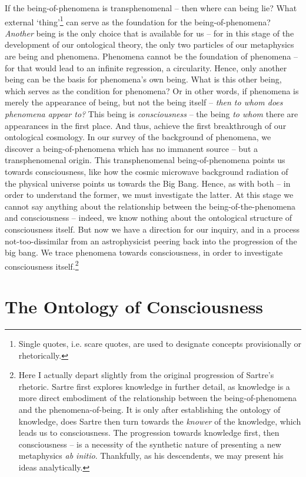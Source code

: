 If the being-of-phenomena is transphenomenal -- then where can being lie? What external \enquote*{thing}\footnote{Single quotes, i.e. scare quotes, are used to designate concepts provisionally or rhetorically.} can serve as the foundation for the being-of-phenomena? \emph{Another} being is the only choice that is available for us -- for in this stage of the development of our ontological theory, the only two particles of our metaphysics are being and phenomena. Phenomena cannot be the foundation of phenomena -- for that would lead to an infinite regression, a circularity. Hence, only another being can be the basis for phenomena's own being. What is this other being, which serves as the condition for phenomena? Or in other words, if phenomena is merely the appearance of being, but not the being itself -- \emph{then to whom does phenomena appear to?} This being is \emph{consciousness} -- the being \emph{to whom} there are appearances in the first place. And thus, achieve the first breakthrough of our ontological cosmology. In our survey of the background of phenomena, we discover a being-of-phenomena which has no immanent source -- but a transphenomenal origin. This transphenomenal being-of-phenomena points us towards consciousness, like how the cosmic microwave background radiation of the physical universe points us towards the Big Bang. Hence, as with both -- in order to understand the former, we must investigate the latter. At this stage we cannot say anything about the relationship between the being-of-the-phenomena and consciousness -- indeed, we know nothing about the ontological structure of consciousness itself. But now we have a direction for our inquiry, and in a process not-too-dissimilar from an astrophysicist peering back into the progression of the big bang. We trace phenomena towards consciousness, in order to investigate consciousness itself.\footnote{Here I actually depart slightly from the original progression of Sartre's rhetoric. Sartre first explores knowledge in further detail, as knowledge is a more direct embodiment of the relationship between the being-of-phenomena and the phenomena-of-being. It is only after establishing the ontology of knowledge, does Sartre then turn towards the \emph{knower} of the knowledge, which leads us to consciousness. The progression towards knowledge first, then consciousness -- is a necessity of the synthetic nature of presenting a new metaphysics \emph{ab initio}. Thankfully, as his descendents, we may present his ideas analytically.}

\section{The Ontology of Consciousness}

